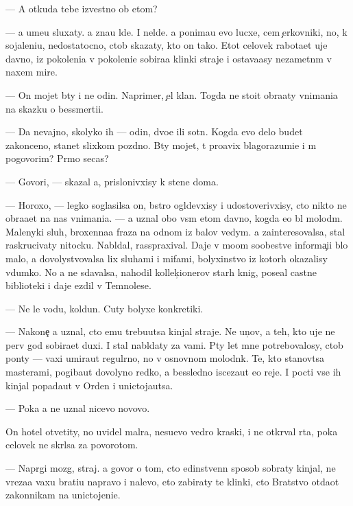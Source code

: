 \documentclass[10pt]{book}
\begin{document}
— A otkuda tebe izvestno ob etom?

— {\Y}a ume{\y}u sluxaty. {\Y}a zna{\y}u l{\io}de{\y}. I nel{\io}de{\y}. {\Y}a ponima{\y}u {\y}evo lucxe, cem {\c}erkovniki, no, k sojaleni{\y}u, nedostatocno, ctob{\yi} skazaty, kto on tako{\y}. Etot celovek rabota{\y}et uje davno, iz pokoleni{\y}a v pokoleni{\y}e sobira{\y}a klinki straje{\y} i ostava{\y}asy nezametn{\yi}m v naxem mire.

— On mojet b{\yi}ty i ne odin. Naprimer, {\c}el{\yi}{\y} klan. Togda ne stoit obra{\x}aty vnimani{\y}a na skazku o bessmerti{\y}i.

— Da ne\-vaj\-no, skoly\-ko ih — odin, dvo{\y}e ili sotn{\ia}. Kogda {\y}evo delo budet zakonceno, stanet slixkom pozdno. B{\yi}ty mojet, t{\yi} pro{\y}avix blagorazumi{\y}e i m{\yi} po\-go\-vo\-rim? Pr{\ia}mo se{\y}cas?

— Govori, — skazal {\y}a, prislonivxisy k stene doma.

— Horoxo, — legko soglasilsa on, b{\yi}stro ogl{\ia}devxisy i udostoverivxisy, cto nikto ne obra{\x}a{\y}et na nas vnimani{\y}a. — {\Y}a uznal obo vs{\e}m etom davno, kogda {\y}e{\x}o b{\yi}l molod{\yi}m. Malenyki{\y} sluh, broxenna{\y}a fraza na odnom iz balov vedym. {\Y}a zainteresovalsa, stal raskrucivaty nitocku. Nabl{\io}dal, rasspraxival. Daje v mo{\y}om so\-ob\-{\x}e\-stve informa{\c}i{\y}i b{\yi}lo malo, {\y}a dovolystvovalsa lix sluhami i mifami, bolyxinstvo iz kotor{\yi}h okazalisy v{\yi}dumko{\y}. No {\y}a ne sdavalsa, nahodil kollek{\c}ionerov star{\yi}h knig, pose{\x}al castn{\yi}{\y}e biblioteki i daje {\y}ezdil v Temnoles{\y}e.

— Ne le{\y} vodu, koldun. Cuty bolyxe konkretiki.

— Nakone{\c} {\y}a uznal, cto {\y}emu trebu{\y}utsa kinjal{\yi} straje{\y}. Ne {\y}un{\c}ov, a teh, kto uje ne perv{\yi}{\y} god sobira{\y}et duxi. I stal nabl{\io}daty za vami. P{\ia}ty let mne potrebovalosy, ctob{\yi} pon{\ia}ty — vaxi umira{\y}ut regul{\ia}rno, no v osnovnom molodn{\ia}k. Te, kto stanov{\ia}tsa masterami, pogiba{\y}ut dovolyno redko, a bessledno isceza{\y}ut {\y}e{\x}o reje. I pocti vse ih kinjal{\yi} popada{\y}ut v Orden i unictoja{\y}utsa.

— Poka {\y}a ne uznal nicevo novovo.

On hotel otvetity, no uvidel mal{\ia}ra, nesu{\x}evo vedro kraski, i ne otkr{\yi}val rta, poka celovek ne skr{\yi}lsa za povorotom.

— Napr{\ia}gi mozg, straj. {\Y}a govor{\io} o tom, cto {\y}edinstvenn{\yi}{\y} sposob sobraty kinjal{\yi}, ne v{\yi}reza{\y}a vaxu brati{\y}u napravo i nalevo, eto zabiraty te klinki, cto Bratstvo otda{\y}ot zakonnikam na unictojeni{\y}e.
\end{document}
